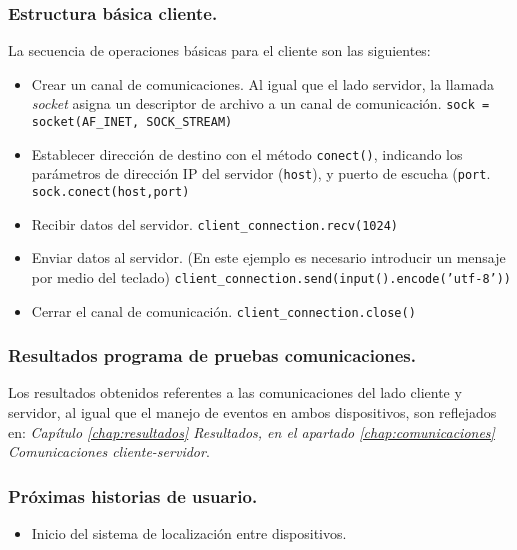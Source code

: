 \subsubsection{Estructura básica cliente.}
La secuencia de operaciones básicas para el cliente son las siguientes:
\begin{itemize}
\item Crear un canal de comunicaciones. Al igual que el lado servidor, la llamada \emph{socket} asigna un descriptor de archivo a un canal de comunicación.
\texttt{sock = socket(AF\_INET, SOCK\_STREAM)}

\item Establecer dirección de destino con el método \texttt{conect()}, indicando los parámetros de dirección IP del servidor (\texttt{host}), y puerto de escucha (\texttt{port}.
\texttt{sock.conect(host,port)}

\item Recibir datos del servidor.
\texttt{client\_connection.recv(1024)}

\item Enviar datos al servidor.
(En este ejemplo es necesario introducir un mensaje por medio del teclado)
\texttt{client\_connection.send(input().encode('utf-8'))}\\

\item Cerrar el canal de comunicación.
\texttt{client\_connection.close()}
\end{itemize}

\subsubsection{Resultados programa de pruebas comunicaciones.}
Los resultados obtenidos referentes a las comunicaciones del lado cliente y servidor, al igual que el manejo de eventos en ambos dispositivos, son reflejados en: \emph{Capítulo \ref{chap:resultados} Resultados, en el apartado \ref{chap:comunicaciones} Comunicaciones cliente-servidor}.


\subsubsection{Próximas historias de usuario.}
\begin{itemize}
\item Inicio del sistema de localización entre dispositivos.
\end{itemize}



